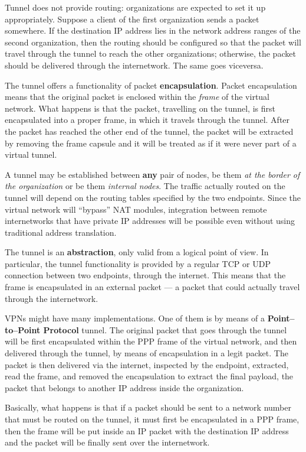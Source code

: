 \documentclass[10pt]{\classname}
\begin{document}
Tunnel does not provide routing: organizations are expected to set it up
appropriately. Suppose a client of the first organization sends a packet
somewhere. If the destination IP address lies in the network address ranges of
the second organization, then the routing should be configured so that the
packet will travel through the tunnel to reach the other organizations;
otherwise, the packet should be delivered through the internetwork. The same
goes viceversa.

The tunnel offers a functionality of packet \textbf{encapsulation}. Packet
encapsulation means that the original packet is enclosed within the
\emph{frame} of the virtual network. What happens is that the packet,
travelling on the tunnel, is first encapsulated into a proper frame, in which
it travels through the tunnel. After the packet has reached the other end of
the tunnel, the packet will be extracted by removing the frame capsule and it
will be treated as if it were never part of a virtual tunnel.

A tunnel may be established between \textbf{any} pair of nodes, be them
\emph{at the border of the organization} or be them \emph{internal nodes}. The
traffic actually routed on the tunnel will depend on the routing tables
specified by the two endpoints. Since the virtual network will ``bypass'' NAT
modules, integration between remote internetworks that have private IP
addresses will be possible even without using traditional address translation.

The tunnel is an \textbf{abstraction}, only valid from a logical point of view.
In particular, the tunnel functionality is provided by a regular TCP or UDP
connection between two endpoints, through the internet. This means that the
frame is encapsulated in an external packet --- a packet that could actually
travel through the internetwork.

VPNs might have many implementations. One of them is by means of a
\textbf{Point--to--Point Protocol} tunnel. The original packet that goes
through the tunnel will be first encapsulated within the PPP frame of the
virtual network, and then delivered through the tunnel, by means of
encapsulation in a legit packet. The packet is then delivered via the internet,
inspected by the endpoint, extracted, read the frame, and removed the
encapsulation to extract the final payload, the packet that belongs to another
IP address inside the organization.

Basically, what happens is that if a packet should be sent to a network number
that must be routed on the tunnel, it must first be encapsulated in a PPP
frame, then the frame will be put inside an IP packet with the destination IP
address and the packet will be finally sent over the internetwork.
\end{document}
